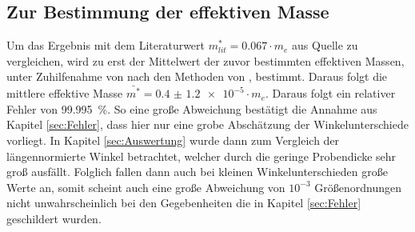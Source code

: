 \subsection{Zur Bestimmung der effektiven Masse}
Um das Ergebnis mit dem Literaturwert $ m_{lit} ^* = 0.067 \cdot m_e$ aus Quelle \cite{effm} zu
vergleichen, wird zu erst der Mittelwert der zuvor bestimmten effektiven Massen, unter Zuhilfenahme
von \cite{numpy} nach den Methoden von \cite{Tipler}, bestimmt.
Daraus folgt die mittlere effektive Masse $\bar{m^*} = \SI{0.4(12)e-5} \cdot m_e$. Daraus folgt ein
relativer Fehler von \SI{99.995}{\percent}. So eine große Abweichung bestätigt die Annahme aus
Kapitel \ref{sec:Fehler}, dass hier nur eine grobe Abschätzung der Winkelunterschiede vorliegt.
In Kapitel \ref{sec:Auswertung} wurde dann zum Vergleich der längennormierte Winkel betrachtet,
welcher durch die geringe Probendicke sehr groß ausfällt. Folglich fallen dann auch bei kleinen
Winkelunterschieden große Werte an, somit scheint  auch eine große Abweichung von $ 10^{-3}$
Größenordnungen nicht unwahrscheinlich bei den Gegebenheiten die in Kapitel \ref{sec:Fehler}
geschildert wurden.
